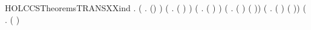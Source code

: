 \newcommand{\HOLCCSTheoremsTRANSXXIMPXXNOXXRESTRXXNIL}{\UseVerbatim{HOLCCSTheoremsTRANSXXIMPXXNOXXRESTRXXNIL}}
\begin{SaveVerbatim}{HOLCCSTheoremsTRANSXXind}
\HOLTokenTurnstile{} \HOLSymConst{\HOLTokenForall{}}.
       (\HOLSymConst{\HOLTokenForall{}} .  ()  ) \HOLSymConst{\HOLTokenConj{}}
       (\HOLSymConst{\HOLTokenForall{}}   .     \HOLSymConst{\HOLTokenImp{}}  ( \HOLSymConst{\ensuremath{+}} )  ) \HOLSymConst{\HOLTokenConj{}}
       (\HOLSymConst{\HOLTokenForall{}}   .     \HOLSymConst{\HOLTokenImp{}}  ( \HOLSymConst{\ensuremath{+}} )  ) \HOLSymConst{\HOLTokenConj{}}
       (\HOLSymConst{\HOLTokenForall{}}   .     \HOLSymConst{\HOLTokenImp{}}  ( \HOLSymConst{\ensuremath{\parallel}} )  ( \HOLSymConst{\ensuremath{\parallel}} )) \HOLSymConst{\HOLTokenConj{}}
       (\HOLSymConst{\HOLTokenForall{}}   .     \HOLSymConst{\HOLTokenImp{}}  ( \HOLSymConst{\ensuremath{\parallel}} )  ( \HOLSymConst{\ensuremath{\parallel}} )) \HOLSymConst{\HOLTokenConj{}}
       (\HOLSymConst{\HOLTokenForall{}}    .
              ( )  \HOLSymConst{\HOLTokenConj{}}

\end{SaveVerbatim}
